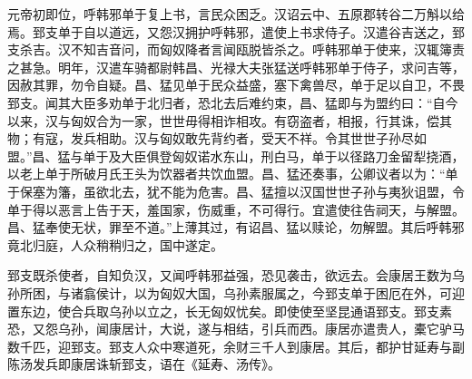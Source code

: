 \documentclass[12pt,UTF8]{ctexbook}
\begin{document}
元帝初即位，呼韩邪单于复上书，言民众困乏。汉诏云中、五原郡转谷二万斛以给焉。郅支单于自以道远，又怨汉拥护呼韩邪，遣使上书求侍子。汉遣谷吉送之，郅支杀吉。汉不知吉音问，而匈奴降者言闻瓯脱皆杀之。呼韩邪单于使来，汉辄簿责之甚急。明年，汉遣车骑都尉韩昌、光禄大夫张猛送呼韩邪单于侍子，求问吉等，因赦其罪，勿令自疑。昌、猛见单于民众益盛，塞下禽兽尽，单于足以自卫，不畏郅支。闻其大臣多劝单于北归者，恐北去后难约束，昌、猛即与为盟约曰：“自今以来，汉与匈奴合为一家，世世毋得相诈相攻。有窃盗者，相报，行其诛，偿其物；有寇，发兵相助。汉与匈奴敢先背约者，受天不祥。令其世世子孙尽如盟。”昌、猛与单于及大臣俱登匈奴诺水东山，刑白马，单于以径路刀金留犁挠酒，以老上单于所破月氏王头为饮器者共饮血盟。昌、猛还奏事，公卿议者以为：“单于保塞为籓，虽欲北去，犹不能为危害。昌、猛擅以汉国世世子孙与夷狄诅盟，令单于得以恶言上告于天，羞国家，伤威重，不可得行。宜遣使往告祠天，与解盟。昌、猛奉使无状，罪至不道。”上薄其过，有诏昌、猛以赎论，勿解盟。其后呼韩邪竟北归庭，人众稍稍归之，国中遂定。



郅支既杀使者，自知负汉，又闻呼韩邪益强，恐见袭击，欲远去。会康居王数为乌孙所困，与诸翕侯计，以为匈奴大国，乌孙素服属之，今郅支单于困厄在外，可迎置东边，使合兵取乌孙以立之，长无匈奴忧矣。即使使至坚昆通语郅支。郅支素恐，又怨乌孙，闻康居计，大说，遂与相结，引兵而西。康居亦遣贵人，橐它驴马数千匹，迎郅支。郅支人众中寒道死，余财三千人到康居。其后，都护甘延寿与副陈汤发兵即康居诛斩郅支，语在《延寿、汤传》。
\end{document}
